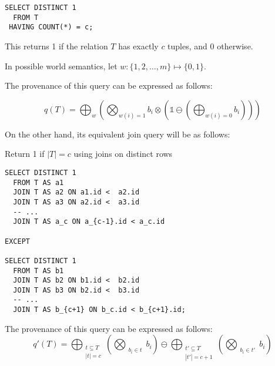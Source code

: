 \documentclass{article}
\begin{document}
\begin{listing}[ht]
\begin{verbatim}
SELECT DISTINCT 1
  FROM T
 HAVING COUNT(*) = c;
\end{verbatim}
\end{listing}

This returns 1 if the relation $T$ has exactly $c$ tuples, and 0 otherwise.

In possible world semantics, let $w: \{1,2,\dots,m\} \mapsto \{0,1\}$.

The provenance of this query can be expressed as follows:

$$q(T) = \bigoplus_{w}\left(\bigotimes_{w(i)=1}b_i\otimes\left(\mathbb{1}\ominus(\bigoplus_{w(i) =0}b_i)\right)\right)$$

On the other hand, its equivalent join query will be as follows:

\begin{listing}[ht]
\caption{Return 1 if \(|T| = c\) using joins on distinct rows}
\begin{verbatim}
SELECT DISTINCT 1
  FROM T AS a1
  JOIN T AS a2 ON a1.id <  a2.id
  JOIN T AS a3 ON a2.id <  a3.id
  -- ...
  JOIN T AS a_c ON a_{c-1}.id < a_c.id

EXCEPT

SELECT DISTINCT 1
  FROM T AS b1
  JOIN T AS b2 ON b1.id <  b2.id
  JOIN T AS b3 ON b2.id <  b3.id
  -- ...
  JOIN T AS b_{c+1} ON b_c.id < b_{c+1}.id;
\end{verbatim}
\end{listing}

The provenance of this query can be expressed as follows:
\[
q'(T) = \bigoplus_{\substack{t\subseteq T \\ |t| = c}}\left(\bigotimes_{\substack{b_i\in t}}b_i\right) \ominus \bigoplus_{\substack{t'\subseteq T \\ |t'| = c+1}}\left(\bigotimes_{\substack{b_i\in t'}}b_i\right)
\]
\end{document}
